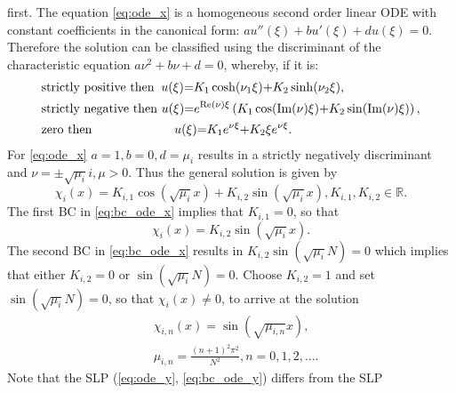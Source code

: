 \documentclass[\main/thesis.tex]{subfiles}
\begin{document}
first. The equation \eqref{eq:ode_x} is a homogeneous second order linear ODE 
with constant coefficients in the canonical form: 
$au''(\xi) {+} bu'(\xi) {+} du(\xi) {=} 0$. Therefore the solution can be 
classified using the discriminant of the characteristic equation
$a\nu^2 {+} b\nu {+} d {=} 0$, whereby, if it is:
\begin{align*}
	&\text{strictly positive then } \hspace{0.03in} u(\xi) {=} K_1 \cosh(\nu_1 \xi) 
	                                                       {+} K_2 \sinh(\nu_2 \xi),
	 \\
	&\text{strictly negative then }                 u(\xi) {=} e^{\text{Re}(\nu) \xi}
	                                                           \left(
	                                                                 K_1 \cos(\text{Im}(\nu) \xi)
	                                                             {+} K_2 \sin(\text{Im}(\nu) \xi)
	                                                           \right),
	 \\
	&\text{zero then }              \hspace{0.87in} u(\xi) {=} K_1 e^{\nu \xi} 
	                                                       {+} K_2 \xi e^{\nu \xi}.
\end{align*}
For \eqref{eq:ode_x} $a {=} 1, b {=} 0, d {=} \mu_i$ results in a strictly 
negatively discriminant and $\nu {=} {\pm}\sqrt{\mu_i}i, \mu {>} 0$. Thus the 
general solution is given by
\begin{equation*}
	\chi_i(x) {=} K_{i,1} \cos(\sqrt{\mu_i} x)
	          {+} K_{i,2} \sin(\sqrt{\mu_i} x), 
	K_{i,1}, K_{i,2} {\in} \mathbb{R}.
\end{equation*}
The first BC in \eqref{eq:bc_ode_x} implies that $K_{i,1} {=} 0$, so that
\begin{equation*}
	\chi_i(x) {=} K_{i,2} \sin(\sqrt{\mu_i} x).
\end{equation*}
The second BC in \eqref{eq:bc_ode_x} results in $K_{i,2} \sin(\sqrt{\mu_i} N) {=} 0$
which implies that either $K_{i,2} {=} 0$ or $\sin(\sqrt{\mu_i} N) {=} 0$. 
Choose $K_{i,2} {=} 1$ and set $\sin(\sqrt{\mu_i} N) {=} 0$, so that $\chi_i(x) {\ne} 0$,
to arrive at the solution
\begin{align*}
	&\chi_{i,n}(x) {=} \sin(\sqrt{\mu_{i,n}} x), \\
	&\mu_{i,n}     {=} \frac{(n {+} 1)^2 \pi^2}
	                        {N^2},
	 n {=} 0, 1, 2, ....
\end{align*}
Note that the SLP (\ref{eq:ode_y}, \ref{eq:bc_ode_y}) differs from the SLP 
\end{document}
